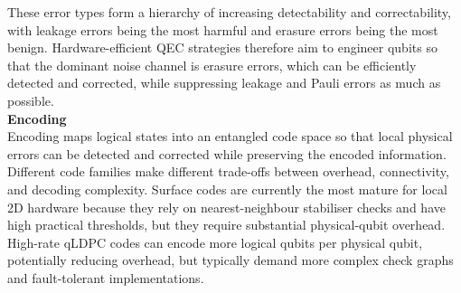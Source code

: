 \documentclass{article}
\begin{document}
    These error types form a hierarchy of increasing detectability and correctability, with leakage errors being the most harmful and erasure errors being the most benign.
    Hardware-efficient QEC strategies therefore aim to engineer qubits so that the dominant noise channel is erasure errors, which can be efficiently detected and corrected, while suppressing leakage and Pauli errors as much as possible.\\

    \textbf{Encoding}\\
    Encoding maps logical states into an entangled code space so that local physical errors can be detected and corrected while preserving the encoded information.
    Different code families make different trade-offs between overhead, connectivity, and decoding complexity. 
    Surface codes are currently the most mature for local 2D hardware because they rely on nearest-neighbour stabiliser checks and have high practical thresholds, but they require substantial physical-qubit overhead. 
    High-rate qLDPC codes can encode more logical qubits per physical qubit, potentially reducing overhead, but typically demand more complex check graphs and fault-tolerant implementations.\\
\end{document}
